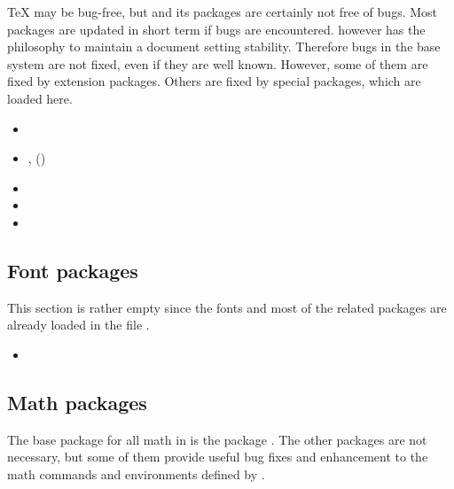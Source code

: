 \TeX{} may be bug-free, but \latex and its packages are certainly not free of bugs.  Most packages are updated in short term if bugs are encountered. \latex however has the philosophy to maintain a document setting stability. Therefore bugs in the base \latex system are not fixed, even if they are well known. However, some of them are fixed by extension packages. Others are fixed by special packages, which are loaded here.

\begin{itemize}[noitemsep]
\item {}
\item {}, ()
\item {}
\item {}
\item {}
\end{itemize}


\subsection{Font packages}
\label{sec:packages:fonts}

This section is rather empty since the fonts and most of the related packages are already loaded in the file .

\begin{itemize}[noitemsep]
\item {}
\end{itemize}


\subsection{Math packages}
\label{sec:packages:math}

The base package for all math in \latex is the package . The other packages are not necessary, but some of them provide useful bug fixes and enhancement to the math commands and environments defined by .

